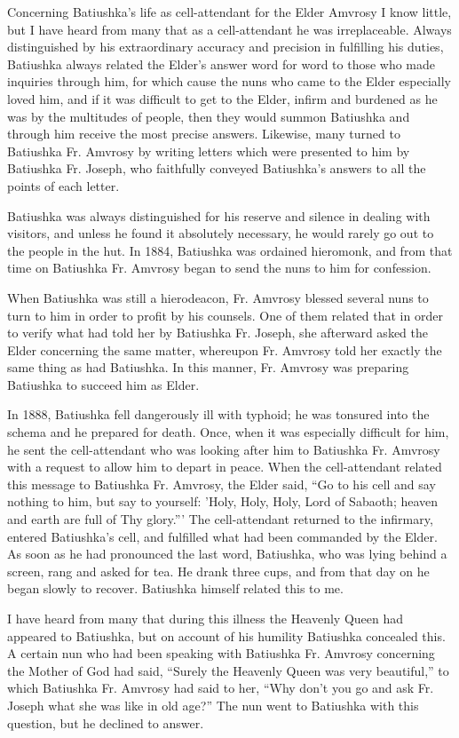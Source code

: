 Concerning Batiushka's life as cell-attendant for the Elder Amvrosy I know little, but I have heard from many that as a cell-attendant he was irreplaceable. Always distinguished by his extraordinary accuracy and precision in fulfilling his duties, Batiushka always related the Elder's answer word for word to those who made inquiries through him, for which cause the nuns who came to the Elder especially loved him, and if it was difficult to get to the Elder, infirm and burdened as he was by the multitudes of people, then they would summon Batiushka and through him receive the most precise answers. Likewise, many turned to Batiushka Fr. Amvrosy by writing letters which were presented to him by Batiushka Fr. Joseph, who faithfully conveyed Batiushka's answers to all the points of each letter.

Batiushka was always distinguished for his reserve and silence in dealing with visitors, and unless he found it absolutely necessary, he would rarely go out to the people in the hut. In 1884, Batiushka was ordained hieromonk, and from that time on Batiushka Fr. Amvrosy began to send the nuns to him for confession.

When Batiushka was still a hierodeacon, Fr. Amvrosy blessed several nuns to turn to him in order to profit by his counsels. One of them related that in order to verify what had told her by Batiushka Fr. Joseph, she afterward asked the Elder concerning the same matter, whereupon Fr. Amvrosy told her exactly the same thing as had Batiushka. In this manner, Fr. Amvrosy was preparing Batiushka to succeed him as Elder.

In 1888, Batiushka fell dangerously ill with typhoid; he was tonsured into the schema and he prepared for death. Once, when it was especially difficult for him, he sent the cell-attendant who was looking after him to Batiushka Fr. Amvrosy with a request to allow him to depart in peace. When the cell-attendant related this message to Batiushka Fr. Amvrosy, the Elder said, ``Go to his cell and say nothing to him, but say to yourself: 'Holy, Holy, Holy, Lord of Sabaoth; heaven and earth are full of Thy glory.''' The cell-attendant returned to the infirmary, entered Batiushka's cell, and fulfilled what had been commanded by the Elder. As soon as he had pronounced the last word, Batiushka, who was lying behind a screen, rang and asked for tea. He drank three cups, and from that day on he began slowly to recover. Batiushka himself related this to me.

I have heard from many that during this illness the Heavenly Queen had appeared to Batiushka, but on account of his humility Batiushka concealed this. A certain nun who had been speaking with Batiushka Fr. Amvrosy concerning the Mother of God had said, ``Surely the Heavenly Queen was very beautiful,'' to which Batiushka Fr. Amvrosy had said to her, ``Why don't you go and ask Fr. Joseph what she was like in old age?'' The nun went to Batiushka with this question, but he declined to answer.

